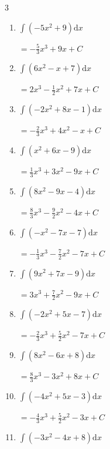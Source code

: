 \begin{multicols}{3}
\begin{enumerate}
  \item $\displaystyle \int \left( -5x^{2}+9 \right) \mathrm{d}x$

        $\displaystyle =-\frac{5}{3}x^{3}+9x+ C$

  \item $\displaystyle \int \left( 6x^{2}-x+7 \right) \mathrm{d}x$

        $\displaystyle =2x^{3}-\frac{1}{2}x^{2}+7x+ C$

  \item $\displaystyle \int \left( -2x^{2}+8x-1 \right) \mathrm{d}x$

        $\displaystyle =-\frac{2}{3}x^{3}+4x^{2}-x+ C$

  \item $\displaystyle \int \left( x^{2}+6x-9 \right) \mathrm{d}x$

        $\displaystyle =\frac{1}{3}x^{3}+3x^{2}-9x+ C$

  \item $\displaystyle \int \left( 8x^{2}-9x-4 \right) \mathrm{d}x$

        $\displaystyle =\frac{8}{3}x^{3}-\frac{9}{2}x^{2}-4x+ C$

  \item $\displaystyle \int \left( -x^{2}-7x-7 \right) \mathrm{d}x$

        $\displaystyle =-\frac{1}{3}x^{3}-\frac{7}{2}x^{2}-7x+ C$

  \item $\displaystyle \int \left( 9x^{2}+7x-9 \right) \mathrm{d}x$

        $\displaystyle =3x^{3}+\frac{7}{2}x^{2}-9x+ C$

  \item $\displaystyle \int \left( -2x^{2}+5x-7 \right) \mathrm{d}x$

        $\displaystyle =-\frac{2}{3}x^{3}+\frac{5}{2}x^{2}-7x+ C$

  \item $\displaystyle \int \left( 8x^{2}-6x+8 \right) \mathrm{d}x$

        $\displaystyle =\frac{8}{3}x^{3}-3x^{2}+8x+ C$

  \item $\displaystyle \int \left( -4x^{2}+5x-3 \right) \mathrm{d}x$

        $\displaystyle =-\frac{4}{3}x^{3}+\frac{5}{2}x^{2}-3x+ C$

\columnbreak %

\resetques

  \item $\displaystyle \int \left( -3x^{2}-4x+8 \right) \mathrm{d}x$


\end{enumerate}
\end{multicols}
